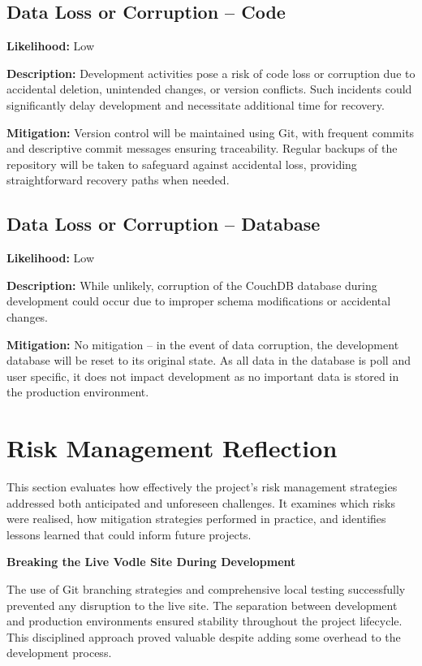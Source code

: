 \subsection*{Data Loss or Corruption -- Code}

\textbf{Likelihood:} Low

\textbf{Description:} Development activities pose a risk of code loss or corruption due to accidental deletion, unintended changes, or version conflicts. Such incidents could significantly delay development and necessitate additional time for recovery.

\textbf{Mitigation:} Version control will be maintained using Git, with frequent commits and descriptive commit messages ensuring traceability. Regular backups of the repository will be taken to safeguard against accidental loss, providing straightforward recovery paths when needed.

\subsection*{Data Loss or Corruption -- Database}

\textbf{Likelihood:} Low

\textbf{Description:} While unlikely, corruption of the CouchDB database during development could occur due to improper schema modifications or accidental changes.

\textbf{Mitigation:} No mitigation -- in the event of data corruption, the development database will be reset to its original state. As all data in the database is poll and user specific, it does not impact development as no important data is stored in the production environment.

\section{Risk Management Reflection}
This section evaluates how effectively the project's risk management strategies addressed both anticipated and unforeseen challenges. It examines which risks were realised, how mitigation strategies performed in practice, and identifies lessons learned that could inform future projects. 

\textbf{Breaking the Live Vodle Site During Development}

The use of Git branching strategies and comprehensive local testing successfully prevented any disruption to the live site. The separation between development and production environments ensured stability throughout the project lifecycle. This disciplined approach proved valuable despite adding some overhead to the development process.

